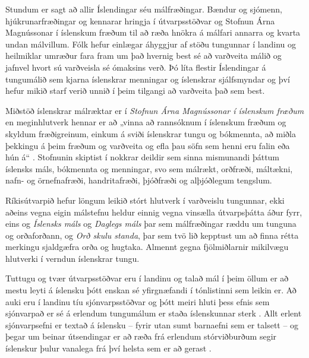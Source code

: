 \documentclass{../../metanetpaper}
\begin{document}
\begin{multicols}{2}

Stundum er sagt að allir Íslendingar séu málfræðingar. Bændur og sjómenn, hjúkrunarfræðingar og kennarar hringja í útvarpsstöðvar og Stofnun Árna Magnússonar í íslenskum fræðum til að ræða hnökra á málfari annarra og kvarta undan málvillum. Fólk hefur einlægar áhyggjur af stöðu tungunnar í landinu og heilmiklar umræður fara fram um það hvernig best sé að varðveita málið og jafnvel hvort sú varðveisla sé ómaksins verð. Þó líta flestir Íslendingar á tungumálið sem kjarna íslenskrar menningar og íslenskrar sjálfsmyndar og því hefur mikið starf verið unnið í þeim tilgangi að varðveita það sem best.

Miðstöð íslenskrar málræktar er í \textit{Stofnun Árna Magnússonar í íslenskum fræðum} en meginhlutverk hennar er að „vinna að rannsóknum í íslenskum fræðum og skyldum fræðigreinum, einkum á sviði íslenskrar tungu og bókmennta, að miðla þekkingu á þeim fræðum og varðveita og efla þau söfn sem henni eru falin eða hún á“ \cite{alt2}. Stofnunin skiptist í nokkrar deildir sem sinna mismunandi þáttum íslensks máls, bókmennta og menningar, svo sem málrækt, orðfræði, máltækni, nafn- og örnefnafræði, handritafræði, þjóðfræði og alþjóðlegum tengslum.
    
Ríkisútvarpið hefur löngum leikið stórt hlutverk í varðveislu tungunnar, ekki aðeins vegna eigin málstefnu heldur einnig vegna vinsælla útvarpsþátta áður fyrr, eins og \textit{Íslensks máls} og \textit{Daglegs máls} þar sem málfræðingar ræddu um tunguna og orðaforðann, og \textit{Orð skulu standa}, þar sem tvö lið kepptust um að finna rétta merkingu sjaldgæfra orða og hugtaka. Almennt gegna fjölmiðlarnir mikilvægu hlutverki í verndun íslenskrar tungu.


Tuttugu og tvær útvarpsstöðvar eru í landinu og talað mál í þeim öllum er að mestu leyti á íslensku þótt enskan sé yfirgnæfandi í tónlistinni sem leikin er. Að auki eru í landinu tíu sjónvarpsstöðvar og þótt meiri hluti þess efnis sem sjónvarpað er sé á erlendum tungumálum er staða íslenskunnar sterk \cite{hag2}. Allt erlent sjónvarpsefni er textað á íslensku -- fyrir utan sumt barnaefni sem er talsett -- og þegar um beinar útsendingar er að ræða frá erlendum stórviðburðum segir íslenskur þulur vanalega frá því helsta sem er að gerast \cite{alt3}.


\end{multicols}
\end{document}
